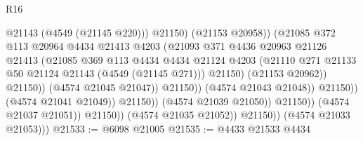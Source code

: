 \begin{lexlean}{R16}
\begin{coremodule}
                                                    @21143
                                                    (@4549 (@21145 @220)))
                                                  @21150)
                                                (@21153 @20958))
                                              (@21085
                                                @372
                                                @113
                                                @20964
                                                @4434
                                                @21413
                                                @4203
                                                (@21093
                                                  @371
                                                  @4436
                                                  @20963
                                                  @21126
                                                  @21413
                                                  (@21085
                                                    @369
                                                    @113
                                                    @4434
                                                    @4434
                                                    @21124
                                                    @4203
                                                    (@21110
                                                      @271
                                                      @21133
                                                      @50
                                                      @21124
                                                      @21143
                                                      (@4549 (@21145 @271)))
                                                    @21150)
                                                  (@21153 @20962))
                                                @21150))
                                            (@4574 @21045 @21047))
                                          @21150))
                                      (@4574 @21043 @21048))
                                    @21150))
                                (@4574 @21041 @21049))
                              @21150))
                          (@4574 @21039 @21050))
                        @21150))
                    (@4574 @21037 @21051))
                  @21150))
              (@4574 @21035 @21052))
            @21150))
        (@4574 @21033 @21053)))
@21533 := @6098 @21005
@21535 := @4433 @21533 @4434

\end{coremodule}
\end{lexlean}
